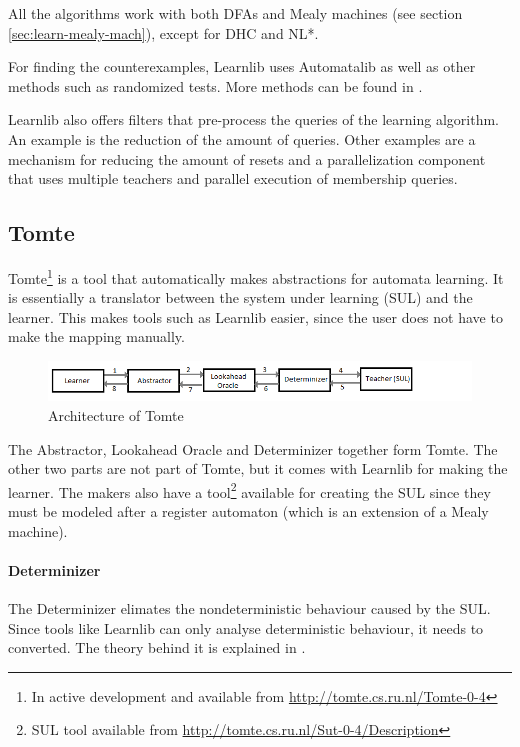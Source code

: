 \documentclass[multi,crop=false,class=article]{standalone}
\begin{document}
All the algorithms work with both DFAs and Mealy machines (see section 
\ref{sec:learn-mealy-mach}), except for DHC\cite{Merten2012} and 
NL*\cite{Bollig2009}.

For finding the counterexamples, Learnlib uses Automatalib as well as other
methods such as randomized tests. More methods can be found in 
\cite[p. 490]{Isberner2015b}.

Learnlib also offers filters that pre-process the queries of the learning 
algorithm. An example is the reduction of the amount of queries. Other examples 
are a mechanism for reducing the amount of resets\cite{Bauer2012} and a 
parallelization component that uses multiple teachers and parallel execution of 
membership queries\cite{Henrix2015,Howar2012}.     


\subsection{Tomte}
\label{ssec:tomte}
Tomte\footnote{In active development and available from
\url{http://tomte.cs.ru.nl/Tomte-0-4}} is a tool that automatically makes
abstractions for automata learning. It is essentially a translator between the
system under learning (SUL) and the learner. This makes tools such as Learnlib 
easier, since the user does not have to make the mapping manually.

\begin{figure}[!ht]
	\includegraphics[width=\textwidth]{Tool_images/tomte_network.png}
	\caption{Architecture of Tomte}
	\label{fig:tomte_arch_interaction}
\end{figure}

The Abstractor, Lookahead Oracle and Determinizer together form Tomte. The
other two parts are not part of Tomte, but it comes with Learnlib for making 
the learner. The makers also have a tool\footnote{SUL tool available from 
\url{http://tomte.cs.ru.nl/Sut-0-4/Description}} available for creating the SUL 
since they must be modeled after a register automaton\cite{Aarts2015} 
(which is an extension of a Mealy machine).

\paragraph{Determinizer} The Determinizer elimates the nondeterministic
behaviour caused by the SUL. Since tools like Learnlib can only analyse
deterministic behaviour, it needs to converted. The theory behind it is
explained in \cite[p. 172]{Aarts2015}.
\end{document}
